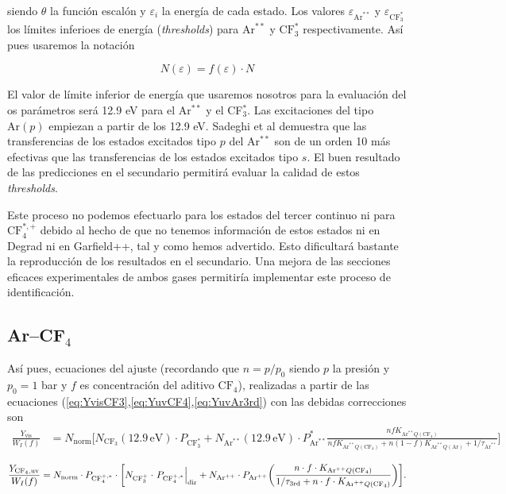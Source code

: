 \documentclass[12pt,a4paper]{article}
\newcommand{\Ar}{\mathrm{Ar}}
\newcommand{\CF}{\mathrm{CF}}
\newcommand{\norma}{\mathrm{norm}}
\newcommand{\vis}{\mathrm{vis}}
\newcommand{\uv}{\mathrm{uv}}
\newcommand{\third}{\mathrm{3rd}}
\newcommand{\dir}{\mathrm{dir}}
\begin{document}
siendo $\theta$ la función escalón y $\varepsilon_i$ la energía de cada estado. Los valores $\varepsilon_{\Ar^{**}}$ y $\varepsilon_{\CF_3^{*}}$ los límites inferioes de energía (\textit{thresholds}) para $\Ar^{**}$ y $\CF_3^{*}$ respectivamente. Así pues usaremos la notación

\begin{equation}
    N(\varepsilon) = f (\varepsilon) \cdot N
\end{equation}

El valor de límite inferior de energía que usaremos nosotros para la evaluación del os parámetros será 12.9 eV para el Ar$^{**}$ y el CF$_3^{*}$. Las excitaciones del tipo $\Ar(p)$ empiezan a partir de los 12.9 eV. Sadeghi et al \cite{Sadeghi} demuestra que las transferencias de los estados excitados tipo $p$ del Ar$^{**}$ son de un orden 10 más efectivas que las transferencias de los estados excitados tipo $s$. El buen resultado de las predicciones en el secundario permitirá evaluar la calidad de estos \textit{thresholds}. 

Este proceso no podemos efectuarlo para los estados del tercer continuo ni para $\CF_4^{*,+}$ debido al hecho de que no tenemos información de estos estados ni en Degrad ni en Garfield++, tal y como hemos advertido. Esto dificultará bastante la reproducción de los resultados en el secundario. Una mejora de las secciones eficaces experimentales de ambos gases permitiría implementar este proceso de identificación.


\subsection{Ar--CF$_4$}

Así pues, ecuaciones del ajuste (recordando que $n=p/p_0$ siendo $p$ la presión y $p_0=1$ bar y $f$ es concentración del aditivo $\CF_4$), realizadas a partir de las ecuaciones (\ref{eq:YvisCF3},\ref{eq:YuvCF4},\ref{eq:YuvAr3rd}) con las debidas correcciones son
{\small
\begin{equation*}
\begin{aligned}
\frac{Y_{\vis}}{W_I(f)}
&=
N_{\norma} \Bigg[
N_{\CF_3}(12.9\,\mathrm{eV})  \cdot P_{\CF_3^*} 
+
N_{\Ar^{**}}(12.9\,\mathrm{eV}) \cdot P_{\Ar^{**}}^*
\frac{
n f K_{\Ar^{**}Q(\CF_4)}
}{
n f K_{\Ar^{**}Q(\CF_4)}
+
n(1-f)K_{\Ar^{**}Q(\Ar)}
+
1/\tau_{\Ar^{**}}
} \Bigg]
\end{aligned}
\end{equation*}
}

\begin{equation*}
    \frac{Y_{\CF_4,\uv}}{W_I(f)} 
    =
    {N_{\norma}}
    \cdot
    P_{\CF_4^{+,*}}
    \cdot
    \bqty{
      N_{\CF_3^+}\cdot \left. P_{\CF_4^{+,*}} \right|_{\dir}
      +
      N_{\Ar^{++}}\cdot P_{\Ar^{++}}
      \pqty{
        \frac{n \cdot f \cdot K_{\Ar^{++}Q(\CF_4)}}{
        1/\tau_{\third} + n \cdot f \cdot K_{\Ar^{++}Q(\CF_4)}}
      }
    }.
\end{equation*}
\end{document}
